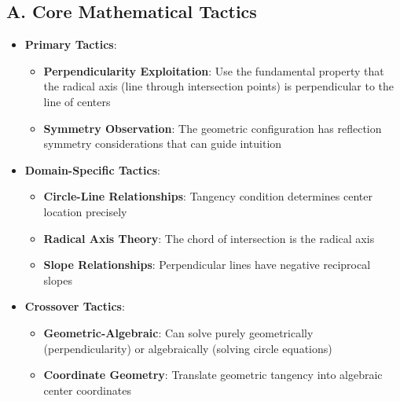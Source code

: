 \documentclass[12pt]{article}
\begin{document}
\begin{tacticalbox}
\subsection*{A. Core Mathematical Tactics}
\begin{itemize}[leftmargin=*]
    \item \textbf{Primary Tactics}: 
    \begin{itemize}
        \item \textbf{Perpendicularity Exploitation}: Use the fundamental property that the radical axis (line through intersection points) is perpendicular to the line of centers
        \item \textbf{Symmetry Observation}: The geometric configuration has reflection symmetry considerations that can guide intuition
    \end{itemize}
    \item \textbf{Domain-Specific Tactics}: 
    \begin{itemize}
        \item \textbf{Circle-Line Relationships}: Tangency condition determines center location precisely
        \item \textbf{Radical Axis Theory}: The chord of intersection is the radical axis
        \item \textbf{Slope Relationships}: Perpendicular lines have negative reciprocal slopes
    \end{itemize}
    \item \textbf{Crossover Tactics}: 
    \begin{itemize}
        \item \textbf{Geometric-Algebraic}: Can solve purely geometrically (perpendicularity) or algebraically (solving circle equations)
        \item \textbf{Coordinate Geometry}: Translate geometric tangency into algebraic center coordinates
    \end{itemize}
\end{itemize}
\end{tacticalbox}
\end{document}
